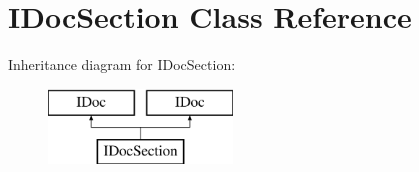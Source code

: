 \hypertarget{class_i_doc_section}{}\section{I\+Doc\+Section Class Reference}
\label{class_i_doc_section}
Inheritance diagram for I\+Doc\+Section\+:\begin{figure}[H]
\begin{center}
\leavevmode
\includegraphics[height=2.000000cm]{class_i_doc_section}
\end{center}
\end{figure}
